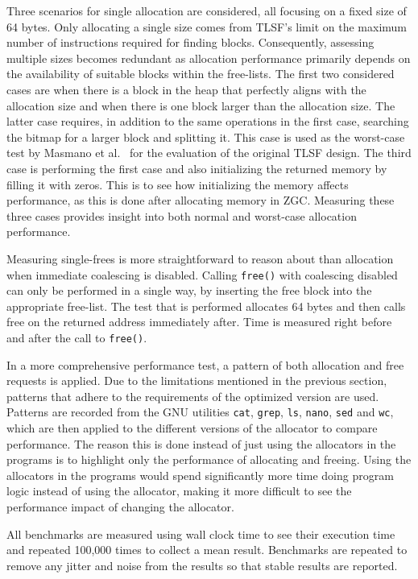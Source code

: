 Three scenarios for single allocation are considered, all focusing on a fixed size of 64 bytes. Only allocating a single size comes from TLSF's limit on the maximum number of instructions required for finding blocks. Consequently, assessing multiple sizes becomes redundant as allocation performance primarily depends on the availability of suitable blocks within the free-lists. The first two considered cases are when there is a block in the heap that perfectly aligns with the allocation size and when there is one block larger than the allocation size. The latter case requires, in addition to the same operations in the first case, searching the bitmap for a larger block and splitting it. This case is used as the worst-case test by Masmano et al.~\cite{TLSF} for the evaluation of the original TLSF design. The third case is performing the first case and also initializing the returned memory by filling it with zeros. This is to see how initializing the memory affects performance, as this is done after allocating memory in ZGC. Measuring these three cases provides insight into both normal and worst-case allocation performance.

\newpage

Measuring single-frees is more straightforward to reason about than allocation when immediate coalescing is disabled. Calling \texttt{free()} with coalescing disabled can only be performed in a single way, by inserting the free block into the appropriate free-list. The test that is performed allocates 64 bytes and then calls free on the returned address immediately after. Time is measured right before and after the call to \texttt{free()}.

In a more comprehensive performance test, a pattern of both allocation and free requests is applied. Due to the limitations mentioned in the previous section, patterns that adhere to the requirements of the optimized version are used. Patterns are recorded from the GNU utilities  \texttt{cat}, \texttt{grep}, \texttt{ls}, \texttt{nano}, \texttt{sed} and \texttt{wc}, which are then applied to the different versions of the allocator to compare performance. The reason this is done instead of just using the allocators in the programs is to highlight only the performance of allocating and freeing. Using the allocators in the programs would spend significantly more time doing program logic instead of using the allocator, making it more difficult to see the performance impact of changing the allocator.

All benchmarks are measured using wall clock time to see their execution time and repeated 100,000 times to collect a mean result. Benchmarks are repeated to remove any jitter and noise from the results so that stable results are reported.

